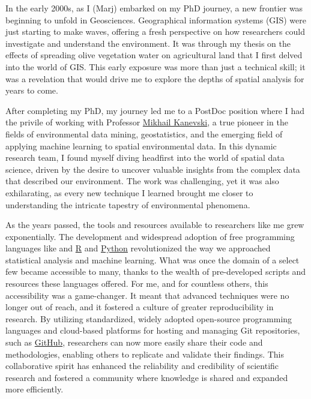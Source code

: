 \documentclass[
]{article}
\begin{document}
In the early 2000s, as I (Marj) embarked on my PhD journey, a new frontier was beginning to unfold in Geosciences.
Geographical information systems (GIS) were just starting to make waves, offering a fresh perspective on how researchers could investigate and understand the environment.
It was through my thesis on the effects of spreading olive vegetation water on agricultural land that I first delved into the world of GIS.
This early exposure was more than just a technical skill; it was a revelation that would drive me to explore the depths of spatial analysis for years to come.

After completing my PhD, my journey led me to a PostDoc position where I had the privile of working with Professor \href{https://www.egu.eu/awards-medals/ian-mcharg/2022/mikhail-kanevski/}{Mikhail Kanevski}, a true pioneer in the fields of environmental data mining, geostatistics, and the emerging field of applying machine learning to spatial environmental data.
In this dynamic research team, I found myself diving headfirst into the world of spatial data science, driven by the desire to uncover valuable insights from the complex data that described our environment.
The work was challenging, yet it was also exhilarating, as every new technique I learned brought me closer to understanding the intricate tapestry of environmental phenomena.

As the years passed, the tools and resources available to researchers like me grew exponentially.
The development and widespread adoption of free programming languages like and \href{https://www.r-project.org/}{R} and \href{https://www.python.org/}{Python} revolutionized the way we approached statistical analysis and machine learning.
What was once the domain of a select few became accessible to many, thanks to the wealth of pre-developed scripts and resources these languages offered.
For me, and for countless others, this accessibility was a game-changer.
It meant that advanced techniques were no longer out of reach, and it fostered a culture of greater reproducibility in research.
By utilizing standardized, widely adopted open-source programming languages and cloud-based platforms for hosting and managing Git repositories, such as \href{https://github.com/}{GitHub}, researchers can now more easily share their code and methodologies, enabling others to replicate and validate their findings.
This collaborative spirit has enhanced the reliability and credibility of scientific research and fostered a community where knowledge is shared and expanded more efficiently.
\end{document}

